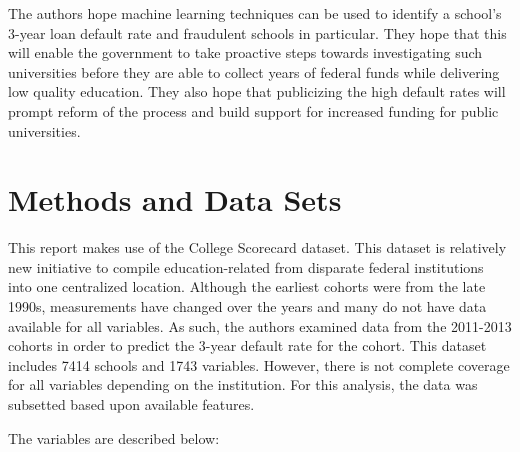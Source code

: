 \documentclass[10pt,twocolumn]{article}
\begin{document}
The authors hope machine learning techniques can be used to identify a school's
3-year loan default rate and fraudulent schools in particular. They hope that this
will enable the government to take proactive steps towards investigating such universities
before they are able to collect years of federal funds while delivering low quality
education. They also hope that publicizing the high default rates will prompt
reform of the process and build support for increased funding for public universities.


\section{Methods and Data Sets}
This report makes use of the College Scorecard dataset. This dataset is relatively new
initiative to compile education-related from disparate federal institutions into
one centralized location. Although the earliest cohorts were from the late 1990s,
measurements have changed over the years and many do not have data available for all variables.
As such, the authors examined data from the 2011-2013 cohorts in order to predict the 3-year
default rate for the cohort. This dataset includes 7414 schools and 1743 variables.
However, there is not complete coverage for all variables depending on the
institution. For this analysis, the data was subsetted based upon available
features.

The variables are described below:
\end{document}
